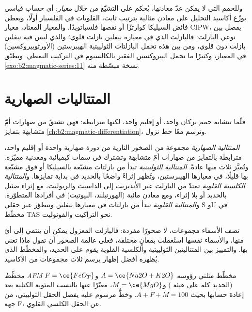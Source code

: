 وللحمم التي لا يمكن عدّ معادنها، يُحكم على التشبّع من خلال \emph{معيار}: أي
حساب قياسي يوزّع أكاسيد التحليل على معادن مثالية
بترتيب ثابت، القلويات في الفلسبار أولًا، ويعطي فائض السيليكا
كوارتزًا أو نقصها فلسباتويدًا. والمعيار المعتاد، معيار CIPW، يفصل بين
نوعي البازلت: فالبازلت الذي في معياره نيفلين بازلت قلوي؛ والذي
ليس فيه نيفلين بازلت دون قلوي، ومن بين هذه تحمل البازلتات الثولييتية
الهيبرستين (الأورثوبيروكسين) في المعيار، وكثيرًا ما تحمل البيروكسين الفقير بالكالسيوم في التركيب النمطي.
ويطبّق \cref{exo:b2:magmatic-series:11} نسخة مبسّطة منه.

\section{المتتاليات الصهارية}\label{sec:b2:magmatic-series:series}

قلّما تتشابه حمم بركان واحد، أو إقليم واحد، لكنها مترابطة: فهي
تشتقّ من صهارات أمّ متشابهة بتمايز
\cref{ch:b2:magmatic-differentiation}، وترسم معًا خط نزول.

\begin{definition}\label{def:b2:magmatic-series:series}
\emph{المتتالية الصهارية} مجموعة من الصخور النارية من دورة
صهارية واحدة أو إقليم واحد، مترابطة بالتمايز من صهارات أمّ متشابهة
وتشترك في سمات كيميائية ومعدنية مميّزة. وتُميَّز ثلاث منها عادةً. \emph{المتتالية الثولييتية} تبدأ من
بازلتات مشبّعة بالسيليكا أو فوق مشبّعة بها قليلًا، في معيارها الهيبرستين،
وتُظهر إثراءً واضحًا بالحديد في بداية تمايزها. و\emph{المتتالية
الكلسية القلوية} تمتدّ من البازلت عبر
الأنديزيت إلى الداسيت والريوليت، مع إثراء ضئيل بالحديد أو بلا إثراء، ومع
معادن مائية (الهورنبلند، البيوتيت) في أفرادها المتطوّرة. و\emph{المتتالية
القلوية} تبدأ من بازلتات في معيارها نيفلين وتتطوّر
عبر حقلي S وU في مخطّط TAS نحو التراكيت والفونوليت.
\end{definition}

تصف الأسماء مجموعات، لا صخورًا مفردة: فالبازلت المعزول يمكن أن ينتمي إلى أيّ
منها، والأسماء نفسها استُعملت بمعانٍ مختلفة، فعلى عالمة الصخور
أن تقول ماذا تعني بها. والتمييز بين المتتاليتين الثولييتية
والكلسية القلوية يقوم على الحديد، والمخطّط الذي يُظهره أفضل إظهار يرسم ثلاث
مجموعات من الأكاسيد.

\begin{definition}\label{def:b2:magmatic-series:afm}
\emph{مخطّط AFM} مخطّط مثلثي رؤوسه
$A = \ce{Na2O + K2O}$ و$F = \ce{FeO_T}$ (الحديد كله على هيئة ) و$M = \ce{MgO}$، معبّرًا عنها
بالنسب المئوية الكتلية بعد إعادة حسابها بحيث $A + F + M = 100$. وخطٌّ مرسوم عليه يفصل
الحقل الثولييتي، من جهة F، عن الحقل الكلسي القلوي.
\end{definition}

